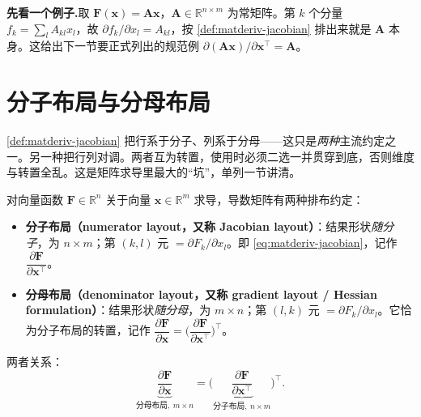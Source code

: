 \begin{note}
\textbf{先看一个例子.}\;取 $\mathbf{F}(\mathbf{x})=\mathbf{A}\mathbf{x}$，$\mathbf{A}\in\mathbb{R}^{n\times m}$ 为常矩阵。第 $k$ 个分量 $f_k=\sum_{l}A_{kl}x_l$，故 $\partial f_k/\partial x_l=A_{kl}$，按 \cref{def:matderiv-jacobian} 排出来就是 $\mathbf{A}$ 本身。这给出下一节要正式列出的规范例 $\partial(\mathbf{A}\mathbf{x})/\partial\mathbf{x}^\top=\mathbf{A}$。
\end{note}

\section{分子布局与分母布局}
\label{sec:matderiv-layout}

\cref{def:matderiv-jacobian} 把行系于分子、列系于分母——这只是\emph{两种}主流约定之一。另一种把行列对调。两者互为转置，使用时必须二选一并贯穿到底，否则维度与转置全乱。这是矩阵求导里最大的“坑”，单列一节讲清。

\begin{definition}[分子布局与分母布局]\label{def:matderiv-layout}
对向量函数 $\mathbf{F}\in\mathbb{R}^n$ 关于向量 $\mathbf{x}\in\mathbb{R}^m$ 求导，导数矩阵有两种排布约定\cite{petersen2012cookbook,magnus2019matrix}：
\begin{itemize}
  \item \textbf{分子布局（numerator layout，又称 Jacobian layout）}：结果形状\emph{随分子}，为 $n\times m$；第 $(k,l)$ 元 $=\partial F_k/\partial x_l$。即 \cref{eq:matderiv-jacobian}，记作 $\dfrac{\partial\mathbf{F}}{\partial\mathbf{x}^\top}$。
  \item \textbf{分母布局（denominator layout，又称 gradient layout / Hessian formulation）}：结果形状\emph{随分母}，为 $m\times n$；第 $(l,k)$ 元 $=\partial F_k/\partial x_l$。它恰为分子布局的转置，记作 $\dfrac{\partial\mathbf{F}}{\partial\mathbf{x}}=\Big(\dfrac{\partial\mathbf{F}}{\partial\mathbf{x}^\top}\Big)^{\!\top}$。
\end{itemize}
两者关系：
\begin{equation}
  \underbrace{\frac{\partial\mathbf{F}}{\partial\mathbf{x}}}_{\text{分母布局},\ m\times n}
  =\bigg(\underbrace{\frac{\partial\mathbf{F}}{\partial\mathbf{x}^\top}}_{\text{分子布局},\ n\times m}\bigg)^{\!\top}.
  \label{eq:matderiv-layout-rel}
\end{equation}
\end{definition}

